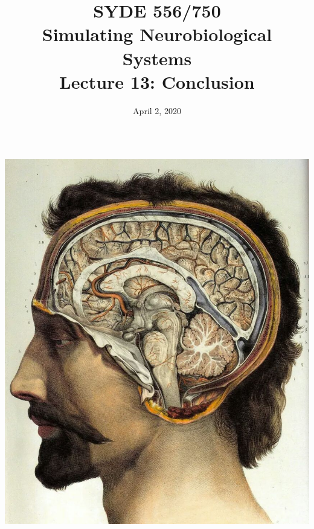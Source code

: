 \documentclass[handout,aspectratio=169]{beamer}
\date{April 2, 2020}
\title{SYDE 556/750 \\ Simulating Neurobiological Systems \\ Lecture 13: Conclusion}
\begin{document}
	
\begin{frame}{}
	\vspace{0.5cm}
	\begin{columns}[c]
		\MakeTitle
		\includegraphics[width=\textwidth]{media/jean_baptiste_marc_bourgery_atlas_of_anatomy_human_brain.jpg}
	\end{columns}
\end{frame}
\end{document}
